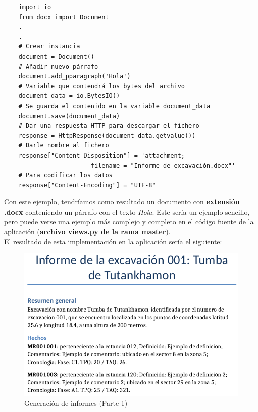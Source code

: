 \begin{verbatim}
    import io
    from docx import Document
    .
    .
    # Crear instancia
    document = Document()
    # Añadir nuevo párrafo
    document.add_pparagraph('Hola')
    # Variable que contendrá los bytes del archivo
    document_data = io.BytesIO()
    # Se guarda el contenido en la variable document_data
    document.save(document_data)
    # Dar una respuesta HTTP para descargar el fichero
    response = HttpResponse(document_data.getvalue())
    # Darle nombre al fichero
    response["Content-Disposition"] = 'attachment;
                        filename = "Informe de excavación.docx"'
    # Para codificar los datos
    response["Content-Encoding"] = "UTF-8"
\end{verbatim}

Con este ejemplo, tendríamos como resultado un documento con \textbf{extensión .docx}
conteniendo un párrafo con el texto \textit{Hola}. Este sería un ejemplo sencillo, pero
puede verse una ejemplo más complejo y completo en el código fuente de la aplicación
(\href{https://github.com/alexespana/TFG/blob/master/code/app/myFindings/views.py}
{\textbf{archivo views.py de la rama master}}). \\

El resultado de esta implementación en la aplicación sería el siguiente:

    \begin{figure}[H]
        \centering
        \includegraphics[scale=0.54]{imagenes/report-generator1.png}
        \caption{Generación de informes (Parte 1)}
        \label{fig:report-generator1}
    \end{figure}

